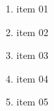 \documentclass{article}
\begin{document}
	\begin{enumerate}
	\item item 01
	\item item 02
	\item item 03
	\item item 04
	\item item 05
	\end{enumerate}
\end{document}

